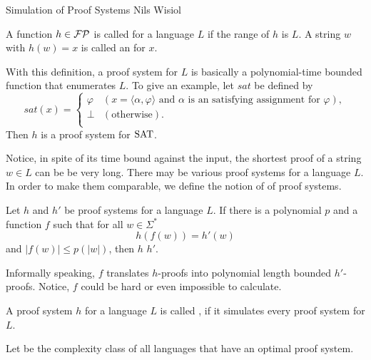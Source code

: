 \documentclass[letterpaper,parskip]{scrartcl}
\begin{document}
  \pagestyle{empty}

  {\huge Simulation of Proof Systems} \hfill Nils Wisiol

  \vspace{3cm}
  
  \begin{definition}
    A function \(h \in \mathcal{FP}\) is called  for a language \(L\) if the range of \(h\) is \(L\). A string \(w\) with \(h(w) = x\) is called an  for \(x\).
  \end{definition}

  With this definition, a proof system for \(L\) is basically a polynomial-time bounded function that enumerates \(L\). To give an example, let \(sat\) be defined by
    \[
       sat(x) =
       \begin{cases}
         \varphi & (x = \langle \alpha, \varphi \rangle \text{ and \(\alpha\) is an satisfying assignment for \(\varphi\)}), \\
         \perp & (\text{otherwise}). \\
       \end{cases}
    \]
  Then \(h\) is a proof system for \(\text{SAT}\).

  Notice, in spite of its time bound against the input, the shortest proof of a string \(w \in L\) can be be very long. There may be various proof systems for a language \(L\). In order to make them comparable, we define the notion of  of proof systems.
  
  \begin{definition}
    Let \(h\) and \(h'\) be proof systems for a language \(L\). If there is a polynomial \(p\) and a function \(f\) such that for all \(w \in \Sigma^*\)
      \[
        h(f(w)) = h'(w)
      \]
    and \(|f(w)| \leq p(|w|)\), then \(h\)  \(h'\).
  \end{definition}

  Informally speaking, \(f\) translates \(h\)-proofs into polynomial length bounded \(h'\)-proofs. Notice, \(f\) could be hard or even impossible to calculate.

  \begin{definition}
    A proof system \(h\) for a language \(L\) is called , if it simulates every proof system for \(L\).
  \end{definition}

  \begin{definition}
    Let  be the complexity class of all languages that have an optimal proof system.
  \end{definition}  
  
\end{document}
